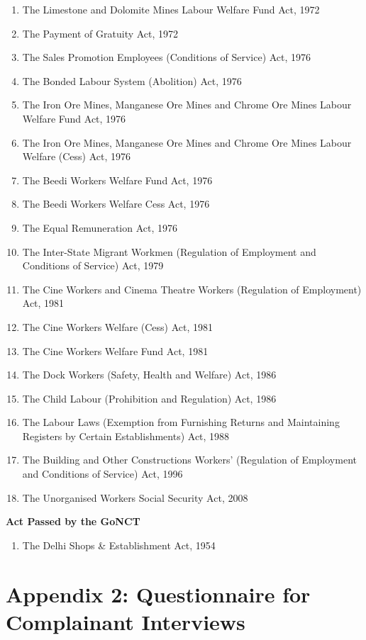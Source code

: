 \documentclass[a4paper, 12pt, twoside]{article}
\begin{document}
\begin{enumerate}[noitemsep]
\item The Limestone and Dolomite Mines Labour Welfare Fund Act, 1972
\item The Payment of Gratuity Act, 1972
\item The Sales Promotion Employees (Conditions of Service) Act, 1976
\item The Bonded Labour System (Abolition) Act, 1976
\item The Iron Ore Mines, Manganese Ore Mines and Chrome Ore Mines Labour Welfare Fund Act, 1976
\item The Iron Ore Mines, Manganese Ore Mines and Chrome Ore Mines Labour Welfare (Cess) Act, 1976
\item The Beedi Workers Welfare Fund Act, 1976
\item The Beedi Workers Welfare Cess Act, 1976
\item The Equal Remuneration Act, 1976
\item The Inter-State Migrant Workmen (Regulation of Employment and Conditions of Service) Act, 1979
\item The Cine Workers and Cinema Theatre Workers (Regulation of Employment) Act, 1981
\item The Cine Workers Welfare (Cess) Act, 1981
\item The Cine Workers Welfare Fund Act, 1981
\item The Dock Workers (Safety, Health and Welfare) Act, 1986
\item The Child Labour (Prohibition and Regulation) Act, 1986
\item The Labour Laws (Exemption from Furnishing Returns and Maintaining Registers by Certain Establishments) Act, 1988
\item The Building and Other Constructions Workers' (Regulation of Employment and Conditions of Service) Act, 1996
\item The Unorganised Workers Social Security Act, 2008 \\ 
\end{enumerate}


\textbf{Act Passed by the GoNCT}
\begin{enumerate}[noitemsep]
\item The Delhi Shops \& Establishment Act, 1954
\end{enumerate}

\newpage      
\section*{Appendix 2: Questionnaire for \\ Complainant Interviews}
\end{document}

